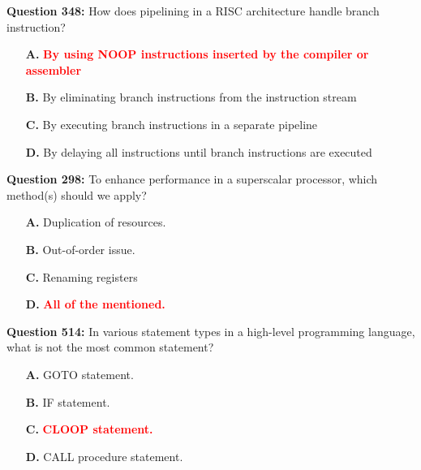 \documentclass[12pt,a4paper]{article}
\begin{document}
\vspace{0.5cm}

\textbf{Question 348:} How does pipelining in a RISC architecture handle branch instruction?

\begin{itemize}
    \item[\textbf{A.}] \textcolor{red}{\textbf{By using NOOP instructions inserted by the compiler or assembler}}
    \item[\textbf{B.}] By eliminating branch instructions from the instruction stream
    \item[\textbf{C.}] By executing branch instructions in a separate pipeline
    \item[\textbf{D.}] By delaying all instructions until branch instructions are executed
\end{itemize}

\vspace{0.5cm}

\vspace{0.5cm}

\textbf{Question 298:} To enhance performance in a superscalar processor, which method(s) should we apply?

\begin{itemize}
    \item[\textbf{A.}] Duplication of resources.
    \item[\textbf{B.}] Out-of-order issue.
    \item[\textbf{C.}] Renaming registers
    \item[\textbf{D.}] \textcolor{red}{\textbf{All of the mentioned.}}
\end{itemize}

\vspace{0.5cm}

\vspace{0.5cm}

\textbf{Question 514:} In various statement types in a high-level programming language, what is not the most common statement?

\begin{itemize}
    \item[\textbf{A.}] GOTO statement.
    \item[\textbf{B.}] IF statement.
    \item[\textbf{C.}] \textcolor{red}{\textbf{CLOOP statement.}}
    \item[\textbf{D.}] CALL procedure statement.
\end{itemize}
\end{document}
